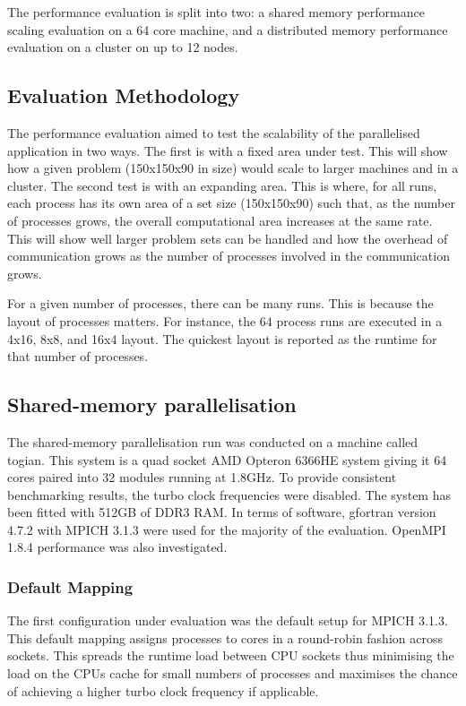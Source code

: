 The performance evaluation is split into two: a shared memory performance
scaling evaluation on a 64 core machine, and a distributed memory performance
evaluation on a cluster on up to 12 nodes.

\subsection{Evaluation Methodology}

The performance evaluation aimed to test the scalability of the parallelised
application in two ways. The first is with a fixed area under test. This will
show how a given problem (150x150x90 in size) would scale to larger machines and
in a cluster. The second test is with an expanding area. This is where, for all
runs, each process has its own area of a set size (150x150x90) such that, as the
number of processes grows, the overall computational area increases at the same
rate. This will show well larger problem sets can be handled and how the
overhead of communication grows as the number of processes involved in the
communication grows.

For a given number of processes, there can be many runs. This is because the
layout of processes matters. For instance, the 64 process runs are executed in a
4x16, 8x8, and 16x4 layout. The quickest layout is reported as the runtime for
that number of processes.

\subsection{Shared-memory parallelisation}

The shared-memory parallelisation run was conducted on a machine called togian.
This system is a quad socket AMD Opteron 6366HE system giving it 64 cores paired
into 32 modules running at 1.8GHz. To provide consistent benchmarking results,
the turbo clock frequencies were disabled. The system has been fitted with 512GB
of DDR3 RAM. In terms of software, gfortran version 4.7.2 with MPICH 3.1.3 were
used for the majority of the evaluation. OpenMPI 1.8.4 performance was also
investigated.

\subsubsection{Default Mapping}

The first configuration under evaluation was the default setup for MPICH 3.1.3.
This default mapping assigns processes to cores in a round-robin fashion across
sockets. This spreads the runtime load between CPU sockets thus minimising the
load on the CPUs cache for small numbers of processes and maximises the chance
of achieving a higher turbo clock frequency if applicable.

